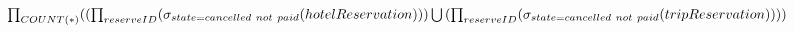 \setLTR
$
\prod_{COUNT(*)}( \\
	(\prod_{reserveID}(\sigma_{state=cancelled \ not \ paid }(hotelReservation))) 
	\\ \bigcup \\
	(\prod_{reserveID}(\sigma_{state=cancelled \ not \ paid }(tripReservation))) 
	)
\\ \\$
\setRTL
